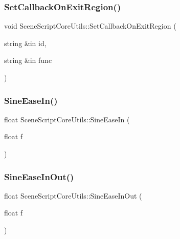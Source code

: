 \hypertarget{class_scene_script_core_utils_a3f8274fd2e3f443468c778c727b63e77}{}\label{class_scene_script_core_utils_a3f8274fd2e3f443468c778c727b63e77} 
\subsubsection{\texorpdfstring{Set\+Callback\+On\+Exit\+Region()}{SetCallbackOnExitRegion()}}
{\footnotesize\ttfamily void Scene\+Script\+Core\+Utils\+::\+Set\+Callback\+On\+Exit\+Region (\begin{DoxyParamCaption}\item[{string \&in}]{id,  }\item[{string \&in}]{func }\end{DoxyParamCaption})}

\hypertarget{class_scene_script_core_utils_a13bf904dd97db82b63493ff762c59138}{}\label{class_scene_script_core_utils_a13bf904dd97db82b63493ff762c59138} 
\subsubsection{\texorpdfstring{Sine\+Ease\+In()}{SineEaseIn()}}
{\footnotesize\ttfamily float Scene\+Script\+Core\+Utils\+::\+Sine\+Ease\+In (\begin{DoxyParamCaption}\item[{float}]{f }\end{DoxyParamCaption})}

\hypertarget{class_scene_script_core_utils_a1e5d1b19fd87a9ee62f595880f59394e}{}\label{class_scene_script_core_utils_a1e5d1b19fd87a9ee62f595880f59394e} 
\subsubsection{\texorpdfstring{Sine\+Ease\+In\+Out()}{SineEaseInOut()}}
{\footnotesize\ttfamily float Scene\+Script\+Core\+Utils\+::\+Sine\+Ease\+In\+Out (\begin{DoxyParamCaption}\item[{float}]{f }\end{DoxyParamCaption})}

